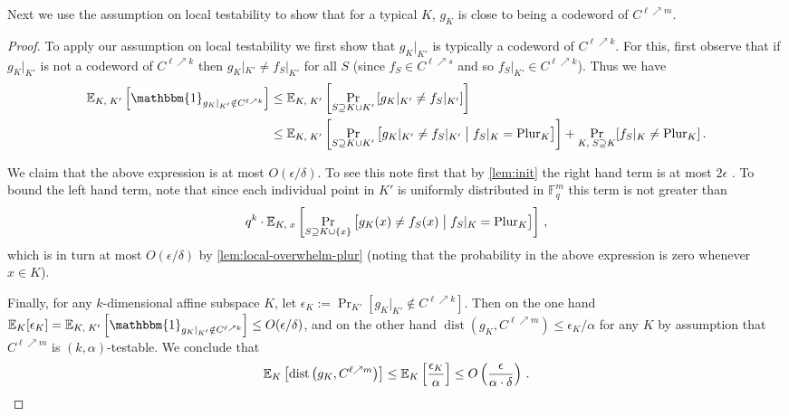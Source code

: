\documentclass{toc}
\theoremstyle{plain}
\DeclareMathOperator{\dist}{dist} %
\newcommand{\E}{{\mathbb{E}}}
\newcommand{\F}{{\mathbb{F}}}
\newcommand{\pl}{{\rm{Plur}}}
\begin{document}
Next we use the assumption on local testability to
show that for a typical $K$, $g_K$ is close to being a codeword of $C^{\ell \nearrow m}$.


\begin{proof}
To apply our assumption on local testability we first show that $g_K|_{K'}$ is typically a codeword of $C^{\ell \nearrow k}$. For this, first observe that if $g_K|_{K'}$ is not a codeword of $C^{\ell \nearrow k}$ then $g_K|_{K'} \neq f_S|_{K'}$ for all $S$ (since $f_S \in C^{\ell \nearrow s}$ and so $f_S|_{K'} \in C^{\ell \nearrow k}$). Thus we have
\begin{align*}
 \E_{K,\;K'}\left[\mathbbm{1}_{g_K|_{K'} \notin C^{\ell \nearrow k}}\right]
&  \leq   \E_{K,{\;K'}}\left[\Pr_{ S \supseteq K \cup K'} \left[g_K|_{K'} \neq f_S|_{K'}  \right] \right] \\
 & \leq  \E_{K,{\;K'}}\left[\Pr_{ S \supseteq K \cup K'} \left[g_K|_{K'} \neq f_S|_{K'} \bigm|  f_S|_K = \pl_K \right] \right] + \Pr_{K,\;S\supseteq K}[ f_S|_K \neq \pl_K]\,.
 \end{align*}

 We claim that the above expression is at most $O(\epsilon/\delta)$.
 To see this note first that by \cref{lem:init} the right hand term is at most $2\epsilon$ . To bound the left hand term, note that since each individual point in $K'$ is uniformly distributed in $\F_q^m$ this term is
%
not greater than  %
\[q^k \cdot \E_{K,\;x}\left[\Pr_{ S \supseteq K \cup \{x\}} \left[g_K(x) \neq f_S(x) \bigm|  f_S|_K = \pl_K \right] \right]\,,\] which is in turn at most $O(\epsilon/\delta)$  by \cref{lem:local-overwhelm-plur} (noting that the probability in the above expression is zero whenever $x \in K$).

Finally, for any $k$-dimensional affine subspace $K$, let $\epsilon_{K}:= \Pr_{K'}\left[g_K|_{K'} \notin C^{\ell \nearrow k}\right]$. Then on the one hand
 $\E_K[\epsilon_K]  = \E_{K,\;K'}\left[\mathbbm{1}_{g_K|_{K'} \notin C^{\ell \nearrow k}}\right]  \leq O(\epsilon/\delta)$, and on the other hand $\dist(g_K, C^{\ell \nearrow m}) \leq \epsilon_K/\alpha$ for any $K$
  by assumption that $C^{\ell \nearrow m}$ is  $(k,\alpha)$-testable. We  conclude that
\[ \mathbb{E}_{K}\left[\dist\big(g_K,C^{\ell \nearrow m}\big)\right]
\leq \E_{K}\left[\frac{\epsilon_K} {\alpha}\right ] \leq O\left(
  \frac{\epsilon} {\alpha \cdot \delta}\right)\,. \qedhere \]
\end{proof}
\end{document}
